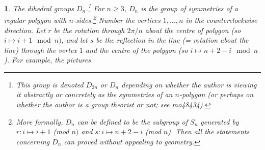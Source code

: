 \documentclass[a4paper,11pt,final]{memoir}%
\newtheorem{plain}[X]{}
\theoremstyle{nonumberplain}
\begin{document}
\begin{plain}
\label{bd8b}\emph{The dihedral groups} $D_{n}$.\footnote{This group is denoted
$D_{2n}$ or $D_{n}$ depending on whether the author is viewing it abstractly
or concretely as the symmetries of an $n$-polygon (or perhaps on whether the
author is a group theorist or not; see mo48434).}%
%
For $n\geq3$, $D_{n}$ is the group of symmetries of a regular polygon with
$n$-sides.\footnote{More formally, $D_{n}$ can be defined to be the subgroup
of $S_{n}$ generated by $r\colon i\mapsto i+1$ (mod $n)$ and $s\colon i\mapsto
n+2-i$ (mod $n$). Then all the statements concerning $D_{n}$ can proved
without appealing to geometry.} Number the vertices $1,\ldots,n$ in the
counterclockwise direction. Let $r$ be the rotation through $2\pi/n$ about the
centre of polygon (so $i\mapsto i+1\mod
n)$, and let $s$ be the reflection in the line (= rotation about the line)
through the vertex $1$ and the centre of the polygon (so $i\mapsto
n+2-i\mod n$). For example, the pictures \bigskip


\end{plain}
\end{document}
